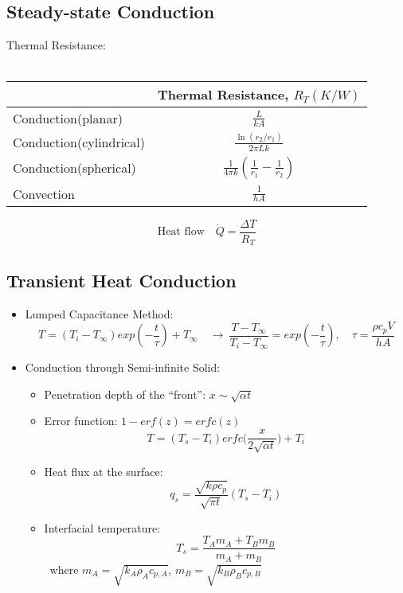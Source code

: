 \documentclass[12pt,a4paper]{article}
\begin{document}
\subsection{Steady-state Conduction}
 Thermal Resistance:\\\\
	\begin{tabular}{l|c}
	& \textbf{Thermal Resistance, $R_{T}(K/W)$}\\ \hline
	 Conduction(planar)  & \large{$\frac{L}{kA}$}\\  [1.3ex]  \hline
	 Conduction(cylindrical) & \large{$\frac{\ln(r_{2}/r_{1})}{2\pi Lk}$}\\  [1.3ex]  \hline
	 Conduction(spherical)  & \large{$\frac{1}{4\pi k}(\frac{1}{r_{1}}-\frac{1}{r_{2}})$}\\  [1.3ex]  \hline
	 Convection &  \large{$\frac{1}{hA}$}\\  [1.3ex]  \hline
	\end{tabular}
	\[\text{Heat flow} \quad \dot{Q} = \frac{\Delta T}{R_{T}} \]

\subsection{Transient Heat Conduction}
\begin{itemize}
	\item Lumped Capacitance Method: \[T =(T_{i}-T_{\infty})exp(-\frac{t}{\tau})+T_{\infty} \quad \to \ \frac{T-T_{\infty}}{T_{i}-T_{\infty}}=exp(-\frac{t}{\tau}), \quad \tau=\frac{\rho c_{p} V}{hA}\] 
	
	\item Conduction through Semi-infinite Solid:
	\begin{itemize}
	\item Penetration depth of the “front”: $x  \sim  \sqrt{\alpha t}$
	\item Error function: $1-erf(z)=erfc(z)$
	\[T=(T_{s}-T_{i})erfc\bigg(\frac{x}{2\sqrt{\alpha t}}\bigg)+T_{i}\] 
	\item Heat flux at the surface:
	\[q_{s} = \frac{\sqrt{k \rho c_{p}}}{\sqrt{\pi t}}(T_{s}-T_{i})\]
	\item Interfacial temperature:
	\[T_{s}=\frac{T_{A}m_{A}+T_{B}m_{B}}{m_{A}+m_{B}}\]
	\ where $m_{A} = \sqrt{k_{A}\rho_{A}c_{p,A}}$, $m_{B} = \sqrt{k_{B}\rho_{B}c_{p,B}}$
	\end{itemize}
\end{itemize}
	
\end{document}
